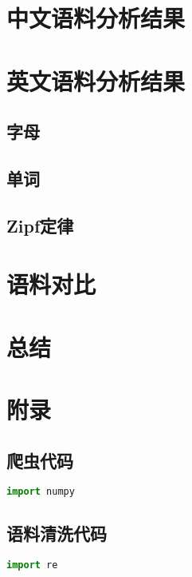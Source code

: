 \documentclass[11pt]{article}
\begin{document}
	\section{中文语料分析结果}
	\section{英文语料分析结果}
	\subsection{字母}
	\subsection{单词}
	\subsection{Zipf定律}
	\section{语料对比}
	\section{总结}
	\section{附录}
	\subsection{爬虫代码}
		\begin{lstlisting}[language=Python]
import numpy
		\end{lstlisting}
	\subsection{语料清洗代码}
		\begin{lstlisting}[language=Python]
import re
		\end{lstlisting}
	
\end{document}
